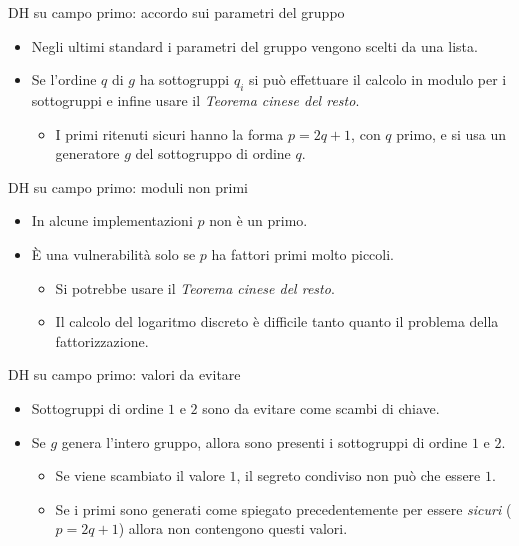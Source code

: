 \documentclass[11pt,svgnames,smaller,aspectratio=169,italian]{beamer}
\begin{document}
\begin{frame}{DH su campo primo: accordo sui parametri del gruppo}
	\begin{itemize}
		\item Negli ultimi standard i parametri del gruppo vengono scelti da una lista.
		\item Se l'ordine $q$ di $g$ ha sottogruppi $q_{i}$ si può effettuare il calcolo in modulo per i sottogruppi e infine usare il \emph{Teorema cinese del resto}.
			\begin{itemize}
				\item I primi ritenuti sicuri hanno la forma $p = 2q + 1$, con $q$ primo, e si usa un generatore $g$ del sottogruppo di ordine $q$.
			\end{itemize}
	\end{itemize}
\end{frame}

\begin{frame}{DH su campo primo: moduli non primi}
	\begin{itemize}
		\item In alcune implementazioni $p$ non è un primo.
		\item È una vulnerabilità solo se $p$ ha fattori primi molto piccoli.
			\begin{itemize}
				\item Si potrebbe usare il \emph{Teorema cinese del resto}.
				\item Il calcolo del logaritmo discreto è difficile tanto quanto il problema della fattorizzazione.
			\end{itemize}
	\end{itemize}
\end{frame}


\begin{frame}{DH su campo primo: valori da evitare}
	\begin{itemize}
		\item Sottogruppi di ordine $1$ e $2$ sono da evitare come scambi di chiave.
		\item Se $g$ genera l'intero gruppo, allora sono presenti i sottogruppi di ordine $1$ e $2$.
			\begin{itemize}
				\item Se viene scambiato il valore $1$, il segreto condiviso non può che essere $1$.
				\item Se i primi sono generati come spiegato precedentemente per essere \emph{sicuri} ($p = 2q + 1$) allora non contengono questi valori.
			\end{itemize}
	\end{itemize}
\end{frame}
\end{document}
